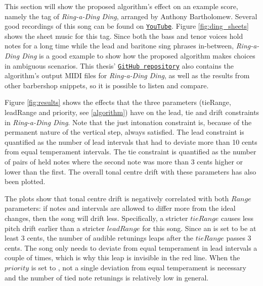 \documentclass[a4paper]{article}
\begin{document}
This section will show the proposed algorithm's effect on an example score, namely the tag of \textit{Ring-a-Ding Ding}, arranged by Anthony Bartholomew. Several good recordings of this song can be found on \texttt{\href{https://www.youtube.com/watch?v=G40I5JDtfjI&t=147s}{YouTube}}. Figure \ref{fig:ding_sheets} shows the sheet music for this tag. \cite{dominikschaller_barbershop_2015} Since both the bass and tenor voices hold notes for a long time while the lead and baritone sing phrases in-between, \textit{Ring-a-Ding Ding} is a good example to show how the proposed algorithm makes choices in ambiguous scenarios. This thesis' \texttt{\href{https://github.com/teuncb/adaptivebarbershop}{GitHub repository}} also contains the algorithm's output MIDI files for \textit{Ring-a-Ding Ding}, as well as the results from other barbershop snippets, so it is possible to listen and compare.

Figure \ref{fig:results} shows the effects that the three parameters (tieRange, leadRange and priority, see \ref{algorithm}) have on the lead, tie and drift constraints in \textit{Ring-a-Ding Ding}. Note that the just intonation constraint is, because of the permanent nature of the vertical step, always satisfied. The lead constraint is quantified as the number of lead intervals that had to deviate more than 10 cents from equal temperament intervals. The tie constraint is quantified as the number of pairs of held notes where the second note was more than 3 cents higher or lower than the first. The overall tonal centre drift with these parameters has also been plotted.

The plots show that tonal centre drift is negatively correlated with both $\mathit{Range}$ parameters: if notes and intervals are allowed to differ more from the ideal changes, then the song will drift less. Specifically, a stricter $\mathit{tieRange}$ causes less pitch drift earlier than a stricter $\mathit{leadRange}$ for this song. Since an  is set to be at least 3 cents, the number of audible retunings leaps after the $\mathit{tieRange}$ passes 3 cents. The song only needs to deviate from equal temperament in lead intervals a couple of times, which is why this leap is invisible in the red line. When the $\mathit{priority}$ is set to , not a single deviation from equal temperament is necessary and the number of tied note retunings is relatively low in general.
\end{document}
